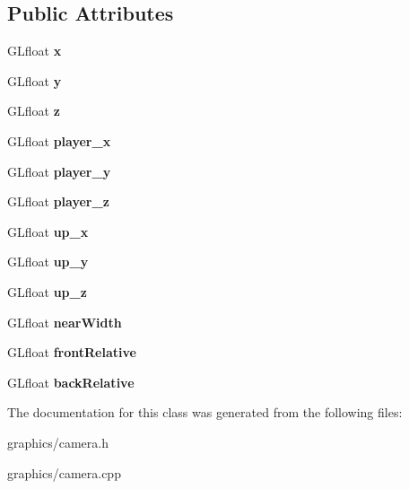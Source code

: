 \subsection*{Public Attributes}
\begin{DoxyCompactItemize}
\item 
\hypertarget{classcamera_aff31d94dec97ad3d4bb1b6873bf657f7}{G\+Lfloat {\bfseries x}}\label{classcamera_aff31d94dec97ad3d4bb1b6873bf657f7}

\item 
\hypertarget{classcamera_a3c1c3ade5503b222793a8448bae6c50c}{G\+Lfloat {\bfseries y}}\label{classcamera_a3c1c3ade5503b222793a8448bae6c50c}

\item 
\hypertarget{classcamera_a893994613b1d4635c57b80ce11cb18a8}{G\+Lfloat {\bfseries z}}\label{classcamera_a893994613b1d4635c57b80ce11cb18a8}

\item 
\hypertarget{classcamera_a3e2c4bfbd2843dfabe9fd6505ad7f422}{G\+Lfloat {\bfseries player\+\_\+x}}\label{classcamera_a3e2c4bfbd2843dfabe9fd6505ad7f422}

\item 
\hypertarget{classcamera_a83d380889eb8ba97bf910f162be8b001}{G\+Lfloat {\bfseries player\+\_\+y}}\label{classcamera_a83d380889eb8ba97bf910f162be8b001}

\item 
\hypertarget{classcamera_a7e83edbd05b295d6ee68ad41b7386b71}{G\+Lfloat {\bfseries player\+\_\+z}}\label{classcamera_a7e83edbd05b295d6ee68ad41b7386b71}

\item 
\hypertarget{classcamera_a67f5841e39235c4cfbb49944f417770f}{G\+Lfloat {\bfseries up\+\_\+x}}\label{classcamera_a67f5841e39235c4cfbb49944f417770f}

\item 
\hypertarget{classcamera_a670c748a12b119ebf4e21dcec99cfb78}{G\+Lfloat {\bfseries up\+\_\+y}}\label{classcamera_a670c748a12b119ebf4e21dcec99cfb78}

\item 
\hypertarget{classcamera_af633538a464ef173d28a484867c63178}{G\+Lfloat {\bfseries up\+\_\+z}}\label{classcamera_af633538a464ef173d28a484867c63178}

\item 
\hypertarget{classcamera_a06358924a175b775f50d377fd1b57a7c}{G\+Lfloat {\bfseries near\+Width}}\label{classcamera_a06358924a175b775f50d377fd1b57a7c}

\item 
\hypertarget{classcamera_a522e1db326f2cbf711bb735b0c5d1e33}{G\+Lfloat {\bfseries front\+Relative}}\label{classcamera_a522e1db326f2cbf711bb735b0c5d1e33}

\item 
\hypertarget{classcamera_a68f94f656769e6596056b3fc8dc3ac60}{G\+Lfloat {\bfseries back\+Relative}}\label{classcamera_a68f94f656769e6596056b3fc8dc3ac60}

\end{DoxyCompactItemize}


The documentation for this class was generated from the following files\+:\begin{DoxyCompactItemize}
\item 
graphics/camera.\+h\item 
graphics/camera.\+cpp\end{DoxyCompactItemize}
